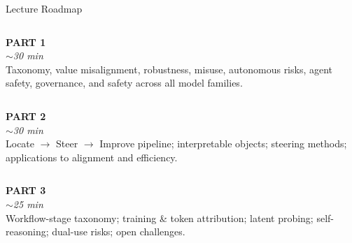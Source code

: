 \begin{frame}{Lecture Roadmap}
  \vspace*{0.2cm}
  \begin{tcolorbox}[enhanced, colback=UCRlgray, colframe=UCRmgray,
      borderline west={4pt}{0pt}{UCRnavy}, sharp corners,
      left=8pt, right=6pt, top=6pt, bottom=6pt]
    \begin{columns}[T]
      {\color{UCRnavy}\small\bfseries PART 1}\\[0.2em]
      {\color{UCRmgray}\scriptsize\itshape $\sim$30 min}
      {\large\bfseries{}}\\[0.2em]
      \footnotesize Taxonomy, value misalignment, robustness, misuse, autonomous risks,
      agent safety, governance, and safety across all model families.
    \end{columns}
  \end{tcolorbox}
  \vspace{0.3em}
  \begin{tcolorbox}[enhanced, colback=UCRlgray, colframe=UCRmgray,
      borderline west={4pt}{0pt}{UCRteal}, sharp corners,
      left=8pt, right=6pt, top=6pt, bottom=6pt]
    \begin{columns}[T]
      {\color{UCRteal}\small\bfseries PART 2}\\[0.2em]
      {\color{UCRmgray}\scriptsize\itshape $\sim$30 min}
      {\large\bfseries{}}\\[0.2em]
      \footnotesize Locate $\to$ Steer $\to$ Improve pipeline; interpretable objects;
      steering methods; applications to alignment and efficiency.
    \end{columns}
  \end{tcolorbox}
  \vspace{0.3em}
  \begin{tcolorbox}[enhanced, colback=UCRlgray, colframe=UCRmgray,
      borderline west={4pt}{0pt}{UCRgreen}, sharp corners,
      left=8pt, right=6pt, top=6pt, bottom=6pt]
    \begin{columns}[T]
      {\color{UCRgreen}\small\bfseries PART 3}\\[0.2em]
      {\color{UCRmgray}\scriptsize\itshape $\sim$25 min}
      {\large\bfseries{}}\\[0.2em]
      \footnotesize Workflow-stage taxonomy; training \& token attribution;
      latent probing; self-reasoning; dual-use risks; open challenges.
    \end{columns}
  \end{tcolorbox}
\end{frame}

